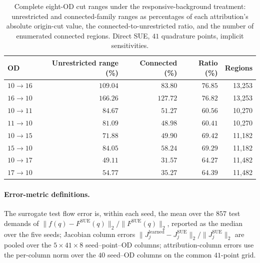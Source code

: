 \begin{table}[pos=htbp]\centering\footnotesize
\caption{Complete eight-OD cut ranges under the responsive-background
treatment: unrestricted and connected-family ranges as percentages of
each attribution's absolute origin-cut value, the
connected-to-unrestricted ratio, and the number of enumerated connected
regions. Direct SUE, $41$ quadrature points, implicit
sensitivities.}\label{tab:cutspreadfull}
\small
\begin{tabular*}{\tblwidth}{@{\extracolsep{\fill}}lrrrr}
\toprule
OD & Unrestricted range (\%) & Connected (\%) & Ratio (\%) & Regions\\
\midrule
$10\to16$ & $109.04$ & $83.80$ & $76.85$ & 13{,}253\\
$16\to10$ & $166.26$ & $127.72$ & $76.82$ & 13{,}253\\
$10\to11$ & $84.67$ & $51.27$ & $60.56$ & 10{,}270\\
$11\to10$ & $81.09$ & $48.98$ & $60.41$ & 10{,}270\\
$10\to15$ & $71.88$ & $49.90$ & $69.42$ & 11{,}182\\
$15\to10$ & $84.05$ & $58.24$ & $69.29$ & 11{,}182\\
$10\to17$ & $49.11$ & $31.57$ & $64.27$ & 11{,}482\\
$17\to10$ & $54.77$ & $35.27$ & $64.39$ & 11{,}482\\
\bottomrule
\end{tabular*}
\end{table}
\paragraph{Error-metric definitions.}
The surrogate test flow error is, within each seed, the mean over the
$857$ test demands of
$\|f(q)-F^{\mathrm{SUE}}(q)\|_2/\|F^{\mathrm{SUE}}(q)\|_2$, reported
as the median over the five seeds; Jacobian column errors
$\|J_j^{\mathrm{learned}}-J_j^{\mathrm{SUE}}\|_2/\|J_j^{\mathrm{SUE}}\|_2$
are pooled over the $5\times41\times8$ seed--point--OD columns;
attribution-column errors use the per-column norm over the $40$
seed--OD columns on the common $41$-point grid.

